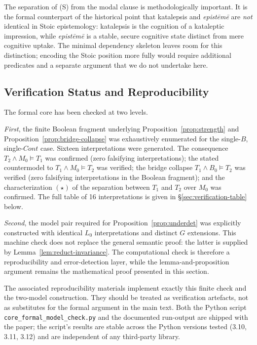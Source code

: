 The separation of (S) from the modal clause is methodologically
important. It is the formal counterpart of the historical point
that katalepsis and \emph{epist\=em\=e} are
\emph{not} identical in Stoic epistemology: katalepsis is the
cognition of a kataleptic impression, while \emph{epist\=em\=e}
is a stable, secure cognitive state distinct from mere cognitive
uptake. The minimal dependency skeleton leaves room for this
distinction; encoding the Stoic position more fully would require
additional predicates and a separate argument that we do not
undertake here.

\subsection{Verification Status and Reproducibility}
\label{sec:verification}

The formal core has been checked at two levels.

\emph{First}, the finite Boolean fragment underlying
Proposition~\ref{prop:strength} and
Proposition~\ref{prop:bridge-collapse} was exhaustively enumerated
for the single-$B$, single-$\mathit{Cont}$ case. Sixteen interpretations were
generated. The consequence $T_2\land M_0\models T_1$ was confirmed
(zero falsifying interpretations); the stated countermodel to
$T_1\land M_0\models T_2$ was verified; the bridge collapse
$T_1\land B_0\models T_2$ was verified (zero falsifying
interpretations in the Boolean fragment); and the characterization
$(\star)$ of the separation between $T_1$ and $T_2$ over $M_0$ was
confirmed. The full table of 16 interpretations is given in
\S\ref{sec:verification-table} below.

\emph{Second}, the model pair required for
Proposition~\ref{prop:underdet} was explicitly constructed with
identical $L_0$ interpretations and distinct $G$ extensions. This
machine check does not replace the general semantic proof: the
latter is supplied by Lemma~\ref{lem:reduct-invariance}. The
computational check is therefore a reproducibility and
error-detection layer, while the lemma-and-proposition argument
remains the mathematical proof presented in this section.

The associated reproducibility materials implement exactly this
finite check and the two-model construction. They should be treated
as verification artefacts, not as substitutes for the formal
argument in the main text. Both the Python script
\texttt{core\_formal\_model\_check.py} and the documented
run-output are shipped with the paper; the script's results are
stable across the Python versions tested (3.10, 3.11, 3.12) and
are independent of any third-party library.

